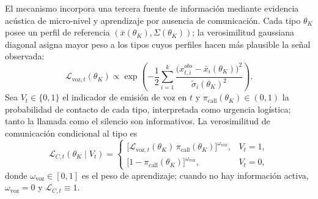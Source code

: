 \documentclass[pdflatex,sn-mathphys-ay]{sn-jnl}
\theoremstyle{thmstyleone}
\theoremstyle{thmstyletwo}
\theoremstyle{thmstylethree}
\newcommand{\1}{\mathbf{1}}
\begin{document}
El mecanismo incorpora una tercera fuente de información mediante evidencia acústica de micro-nivel y aprendizaje por ausencia de comunicación. Cada tipo $\theta_K$ posee un perfil de referencia $(\bar{x}(\theta_K),\Sigma(\theta_K))$; la verosimilitud gaussiana diagonal asigna mayor peso a los tipos cuyos perfiles hacen más plausible la señal observada:
\begin{equation}
\mathcal{L}_{\mathrm{voz},t}(\theta_K)\propto\exp\!\left(-\frac{1}{2}\sum_{i=1}^{k}\frac{\bigl(x_{t,i}^{obs}-\bar{x}_i(\theta_K)\bigr)^2}{\tilde{\sigma}_i(\theta_K)^2}\right).
\label{eq:Lvoz}
\end{equation}
Sea $V_t\in\{0,1\}$ el indicador de emisión de voz en $t$ y $\pi_{\mathrm{call}}(\theta_K)\in(0,1)$ la probabilidad de contacto de cada tipo, interpretada como urgencia logística; tanto la llamada como el silencio son informativos. La verosimilitud de comunicación condicional al tipo es
\begin{equation}
\mathcal{L}_{C,t}(\theta_K\mid V_t)=\begin{cases}\bigl[\mathcal{L}_{\mathrm{voz},t}(\theta_K)\,\pi_{\mathrm{call}}(\theta_K)\bigr]^{\omega_{\mathrm{voz}}}, & V_t=1,\\[0.5em]\bigl[1-\pi_{\mathrm{call}}(\theta_K)\bigr]^{\omega_{\mathrm{voz}}}, & V_t=0,\end{cases}
\label{eq:LC}
\end{equation}
donde $\omega_{\mathrm{voz}}\in[0,1]$ es el peso de aprendizaje; cuando no hay información activa, $\omega_{\mathrm{voz}}=0$ y $\mathcal{L}_{C,t}\equiv 1$.
\end{document}
